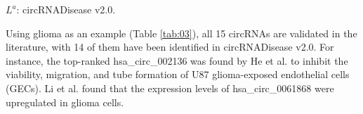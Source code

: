 \documentclass[journal=jcisd8,manuscript=article]{achemso}
\begin{document}
\begin{table}[htbp]
    \renewcommand{\arraystretch}{1.2}
        \centering
        \caption{Top 15 predicted results of systemic lupus erythematosus-related circRNAs based on MKCD.}	\label{tab:tab4}
        \vspace{-0.2cm}
        \label{tab:05}
     \vspace{-0.4cm}
     \begin{flushleft}
         $L^a$: circRNADisease v2.0.
     \end{flushleft}
     \vspace{-0.3cm}
 \end{table}


Using glioma as an example (Table \ref{tab:03}), all 15 circRNAs are validated in the literature, with 14 of them have been identified in circRNADisease v2.0. For instance, the top-ranked hsa\_circ\_002136 was found by He et al. \cite{he2019fus} to inhibit the viability, migration, and tube formation of U87 glioma-exposed endothelial cells (GECs). Li et al. \cite{li2019circ} found that the expression levels of hsa\_circ\_0061868 were upregulated in glioma cells.
\end{document}
